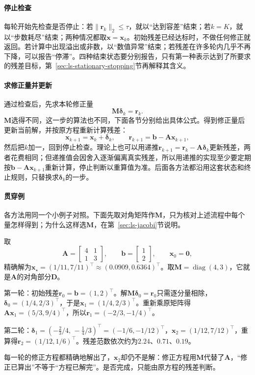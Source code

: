 \paragraph{停止检查}
每轮开始先检查是否停止：若$\lVert\bm r_k\rVert_2\leq\tau$，就以“达到容差”结束；若$k=K$，就以“步数耗尽”结束；两种情况都取$\bm x=\bm x_k$。初始残差已经达标时，不做任何修正就返回。若计算中出现溢出或非数，以“数值异常”结束；若残差在许多轮内几乎不再下降，可以报告“停滞”。四种结束状态要分别报告，只有第一种表示达到了所要求的残差目标，第~\ref{sec:ls-stationary-stopping}节再解释其含义。

\paragraph{求修正量并更新}
通过检查后，先求本轮修正量
\[
\bm M\bm\delta_k=\bm r_k .
\]
$\bm M$选得不同，这一步的算法也不同，下面各节分别给出具体公式。得到修正量后更新当前解，并按原方程重新计算残差：
\[
\bm x_{k+1}=\bm x_k+\bm\delta_k ,\qquad
\bm r_{k+1}=\bm b-\bm A\bm x_{k+1},
\]
然后把$k$加一，回到停止检查。理论上也可以用递推$\bm r_{k+1}=\bm r_k-\bm A\bm\delta_k$更新残差，两者花费相同；但递推值会因舍入逐渐偏离真实残差，所以用递推的实现至少要定期按$\bm b-\bm A\bm x_{k+1}$重新计算，停止判断以重算值为准。后面各方法都沿用这套状态和终止规则，只替换求$\bm\delta_k$的一步。

\paragraph{贯穿例}
各方法用同一个小例子对照。下面先取对角矩阵作$\bm M$，只为核对上述流程中每个量怎样得到；为什么这样选$\bm M$，在第~\ref{sec:ls-jacobi}节说明。
\begin{example}[定常迭代的贯穿例]
\label{ex:ls-stationary-running-example}
取
\[
\bm A=\begin{bmatrix}4&1\\1&3\end{bmatrix},\qquad
\bm b=\begin{bmatrix}1\\2\end{bmatrix},\qquad
\bm x_0=\bm 0,
\]
精确解为$\bm x_\star=(1/11,7/11)^\top\approx(0.0909,0.6364)^\top$。取$\bm M=\operatorname{diag}(4,3)$，它就是$\bm A$的对角部分$\bm D$。

第一轮：初始残差$\bm r_0=\bm b=(1,2)^\top$。解$\bm M\bm\delta_0=\bm r_0$只需逐分量相除，$\bm\delta_0=(1/4,2/3)^\top$，于是$\bm x_1=(1/4,2/3)^\top$。重新乘原矩阵得$\bm A\bm x_1=(5/3,9/4)^\top$，所以$\bm r_1=(-2/3,-1/4)^\top$。

第二轮：$\bm\delta_1=(-\tfrac23/4,\,-\tfrac14/3)^\top=(-1/6,-1/12)^\top$，$\bm x_2=(1/12,7/12)^\top$，重算得$\bm r_2=(1/12,1/6)^\top$。残差范数依次约为$2.24$、$0.71$、$0.19$。

每一轮的修正方程都精确地解出了，$\bm x_2$却仍不是解：修正方程用$\bm M$代替了$\bm A$，“修正已算出”不等于“方程已解完”。是否完成，只能由原方程的残差判断。
\end{example}

